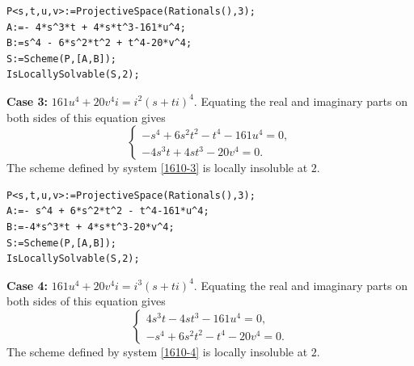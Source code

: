 \documentclass[a4paper,12pt,english,reqno]{amsart}
\begin{document}

\begin{lstlisting}
P<s,t,u,v>:=ProjectiveSpace(Rationals(),3);
A:=- 4*s^3*t + 4*s*t^3-161*u^4;
B:=s^4 - 6*s^2*t^2 + t^4-20*v^4;
S:=Scheme(P,[A,B]);
IsLocallySolvable(S,2);
\end{lstlisting}

{\bf Case 3:} $161 u^4+20v^4i=i^2(s+ti)^4$. Equating the real and imaginary parts on both sides of this equation gives
\begin{equation}\label{1610-3}
\begin{cases}
- s^4 + 6s^2t^2 - t^4-161u^4=0,\\
-4s^3t + 4st^3-20v^4=0.
\end{cases}
\end{equation}
The scheme defined by system \eqref{1610-3} is locally insoluble at $2$.


\begin{lstlisting}
P<s,t,u,v>:=ProjectiveSpace(Rationals(),3);
A:=- s^4 + 6*s^2*t^2 - t^4-161*u^4;
B:=-4*s^3*t + 4*s*t^3-20*v^4;
S:=Scheme(P,[A,B]);
IsLocallySolvable(S,2);
\end{lstlisting}

{\bf Case 4:} $161 u^4+20v^4i=i^3(s+ti)^4$. Equating the real and imaginary parts on both sides of this equation gives
\begin{equation}\label{1610-4}
\begin{cases}
4s^3t - 4st^3-161u^4=0,\\
-s^4 + 6s^2t^2 - t^4-20v^4=0.
\end{cases}
\end{equation}
The scheme defined by system \eqref{1610-4} is locally insoluble at $2$.

\end{document}
